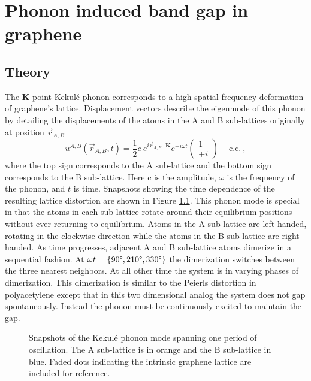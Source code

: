 \chapter{Phonon induced band gap in graphene \label{chap:kek}}

\section{Theory}
The $\bm{K}$ point Kekul\'e phonon corresponds to a high spatial frequency deformation of graphene's lattice.
Displacement vectors describe the eigenmode of this phonon by detailing the displacements of the atoms in the A and B sub-lattices originally at position $\vec{r}_{A,B}$
\begin{equation}
	u^{A,B}(\vec{r}_{A,B},t)=\frac{1}{2} c \ e^{i \vec{r}_{A,B} \cdot \bm{K}} e^{-i \omega t} 
		\left( \begin{array}{c}
			1 \\
			\mp i
		\end{array} \right)
	 + \text{c.c.} \label{eq:kek:displacements} \ ,
\end{equation}
where the top sign corresponds to the A sub-lattice and the bottom sign corresponds to the B sub-lattice.
Here c is the amplitude, $\omega$ is the frequency of the phonon, and $t$ is time.
Snapshots showing the time dependence of the resulting lattice distortion are shown in Figure \ref{fig:kek:snapshots}.
This phonon mode is special in that the atoms in each sub-lattice rotate around their equilibrium positions without ever returning to equilibrium.
Atoms in the A sub-lattice are left handed, rotating in the clockwise direction while the atoms in the B sub-lattice are right handed.
As time progresses, adjacent A and B sub-lattice atoms dimerize in a sequential fashion.
At $\omega t=\{90 \text{\textdegree}, 210 \text{\textdegree}, 330 \text{\textdegree} \}$ the dimerization switches between the three nearest neighbors.
At all other time the system is in varying phases of dimerization.
This dimerization is similar to the Peierls distortion in polyacetylene except that in this two dimensional analog the system does not gap spontaneously.
Instead the phonon must be continuously excited to maintain the gap.

\begin{figure}
	\begin{center}
	
	\end{center}
	\caption[Snapshots of the Kekul\'e phonon mode]{\label{fig:kek:snapshots}
		Snapshots of the Kekul\'e phonon mode spanning one period of oscillation.
		The A sub-lattice is in orange and the B sub-lattice in blue.
		Faded dots indicating the intrinsic graphene lattice are included for reference.}
\end{figure}


